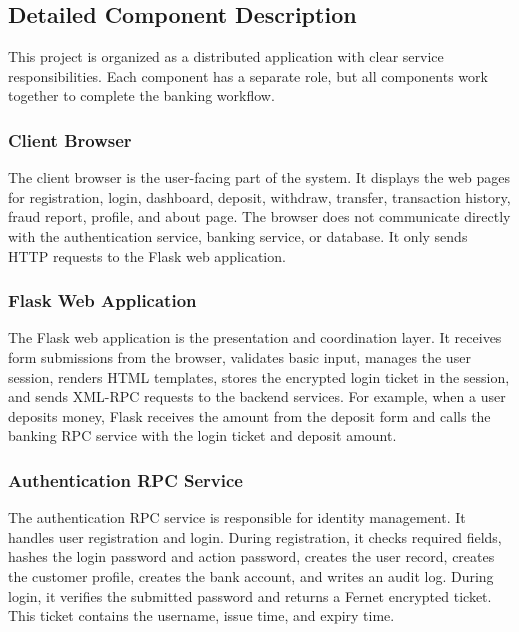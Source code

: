 \documentclass[12pt,a4paper]{article}
\newcommand{\subsectionbreakguard}{\Needspace{5\baselineskip}}
\begin{document}
\subsectionbreakguard
\subsection{Detailed Component Description}

This project is organized as a distributed application with clear service responsibilities. Each component has a separate role, but all components work together to complete the banking workflow.

\subsubsection{Client Browser}

The client browser is the user-facing part of the system. It displays the web pages for registration, login, dashboard, deposit, withdraw, transfer, transaction history, fraud report, profile, and about page. The browser does not communicate directly with the authentication service, banking service, or database. It only sends HTTP requests to the Flask web application.

\subsubsection{Flask Web Application}

The Flask web application is the presentation and coordination layer. It receives form submissions from the browser, validates basic input, manages the user session, renders HTML templates, stores the encrypted login ticket in the session, and sends XML-RPC requests to the backend services. For example, when a user deposits money, Flask receives the amount from the deposit form and calls the banking RPC service with the login ticket and deposit amount.

\subsubsection{Authentication RPC Service}

The authentication RPC service is responsible for identity management. It handles user registration and login. During registration, it checks required fields, hashes the login password and action password, creates the user record, creates the customer profile, creates the bank account, and writes an audit log. During login, it verifies the submitted password and returns a Fernet encrypted ticket. This ticket contains the username, issue time, and expiry time.
\end{document}
